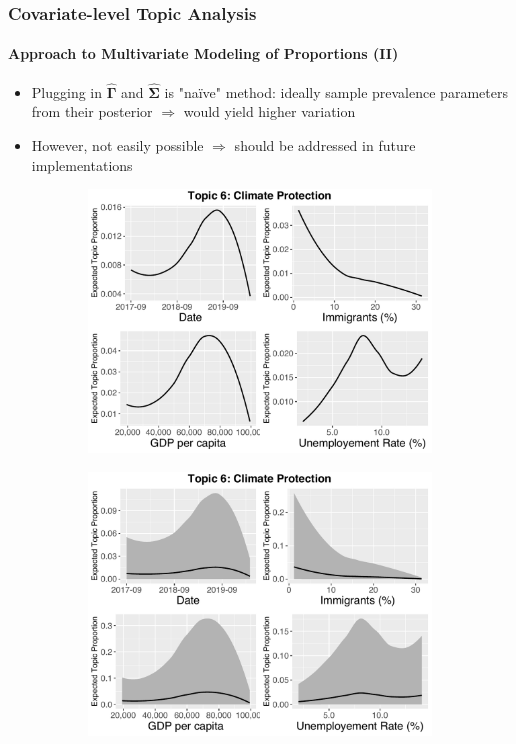 \documentclass[xcolor=dvipsnames]{beamer}
\begin{document}
\begin{frame}
\frametitle{Covariate-level Topic Analysis}
\framesubtitle{Approach to Multivariate Modeling of Proportions (II)}
\begin{itemize}
\item Plugging in $\hat{\boldsymbol{\Gamma}}$ and $\hat{\boldsymbol{\Sigma}}$ is "na{\"i}ve" method: ideally sample prevalence parameters from their posterior $\Rightarrow$ would yield higher variation
\item However, not easily possible $\Rightarrow$ should be addressed in future implementations
\end{itemize}
\begin{figure}[h!]
  \centering
  \captionsetup{justification=centering}
  \begin{subfigure}[b]{0.4\linewidth}
    \includegraphics[width=\linewidth]{../plots/presentation/direct_t6_without_credible.pdf}
  \end{subfigure}
  \begin{subfigure}[b]{0.4\linewidth}
    \includegraphics[width=\linewidth]{../plots/presentation/direct_t6_with_credible.pdf}
  \end{subfigure}
\end{figure}
\end{frame}
\end{document}

